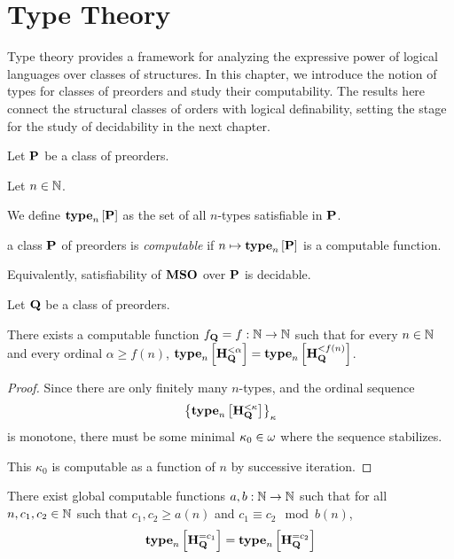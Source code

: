 \section{Type Theory}

Type theory provides a framework for analyzing the expressive power of logical languages over classes of structures. In this chapter, we introduce the notion of types for classes of preorders and study their computability. The results here connect the structural classes of orders with logical definability, setting the stage for the study of decidability in the next chapter.

\begin{definition}
    Let $\mathbf{P}$ be a class of preorders.

    Let $n \in \mathbb{N}$.

    We define $\mathbf{type}_{n} \left[ {\mathbf{P}} \right]$ as the set of all
    $n$-types satisfiable in $\mathbf{P}$.
\end{definition}

\begin{definition}
    a class $\mathbf{P}$ of preorders is \emph{computable} if
    $n \mapsto \mathbf{type}_{n} \left[ {\mathbf{P}} \right]$ is a computable function.

    Equivalently, satisfiability of $\mathbf{MSO}$ over $\mathbf{P}$ is decidable.
\end{definition}

\begin{lemma}\label{f-lemma}
    Let $\mathbf{Q}$ be a class of preorders.

    There exists a computable function $f_{\mathbf{Q}} = f: \mathbb{N} \to \mathbb{N}$ such that
    for every $n \in \mathbb{N}$ and every ordinal $\alpha \ge f(n)$,
    $\mathbf{type}_{n} \left[ {\mathbf{H}_{\mathbf{Q}}^{< \alpha}} \right] = \mathbf{type}_{n} \left[ {\mathbf{H}_{\mathbf{Q}}^{< f(n)}} \right]$.
\end{lemma}

\begin{proof}
    Since there are only finitely many $n$-types,
    and the ordinal sequence \[\left\{ {\mathbf{type}_{n} \left[ {\mathbf{H}_{\mathbf{Q}}^{< \kappa}} \right]} \right\}_{\kappa}\]
    is monotone,
    there must be some minimal $\kappa_0 \in \omega$ where the sequence stabilizes.

    This $\kappa_0$ is computable as a function of $n$ by successive iteration.
\end{proof}

\begin{lemma}\label{ab-lemma}
    There exist global computable functions $a, b : \mathbb{N} \to \mathbb{N}$ such that
    for all $n, c_1, c_2 \in \mathbb{N}$ such that $c_1, c_2 \ge a(n)$ and $c_1 \equiv c_2 \mod b(n)$,
    \[\mathbf{type}_{n} \left[ {\mathbf{H}_{\mathbf{Q}}^{= c_1}} \right] = \mathbf{type}_{n} \left[ {\mathbf{H}_{\mathbf{Q}}^{= c_2}} \right]\]
\end{lemma}

